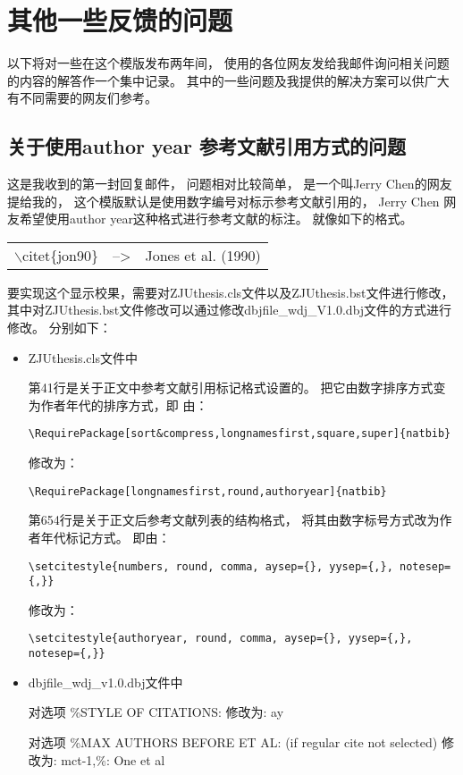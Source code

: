 \chapter{其他一些反馈的问题}

以下将对一些在这个模版发布两年间，
使用的各位网友发给我邮件询问相关问题的内容的解答作一个集中记录。
其中的一些问题及我提供的解决方案可以供广大有不同需要的网友们参考。

\section{关于使用author year 参考文献引用方式的问题}

这是我收到的第一封回复邮件，
问题相对比较简单，
是一个叫Jerry Chen的网友提给我的，
这个模版默认是使用数字编号对标示参考文献引用的，
Jerry Chen 网友希望使用author year这种格式进行参考文献的标注。
就像如下的格式。

\begin{center}
\begin{tabular}{p{3cm}cp{5cm}}
$\backslash$citet\{jon90\} & --> & Jones et al. (1990) \\
\end{tabular}
\end{center}

要实现这个显示校果，需要对ZJUthesis.cls文件以及ZJUthesis.bst文件进行修改，
其中对ZJUthesis.bst文件修改可以通过修改dbjfile\_wdj\_V1.0.dbj文件的方式进行修改。
分别如下：

\begin{itemize}
\item{ZJUthesis.cls文件中}

第41行是关于正文中参考文献引用标记格式设置的。
把它由数字排序方式变为作者年代的排序方式，即
由：

{
\verb+\RequirePackage[sort&compress,longnamesfirst,square,super]{natbib}+
}

修改为：

{
\verb+\RequirePackage[longnamesfirst,round,authoryear]{natbib}+
}

第654行是关于正文后参考文献列表的结构格式，
将其由数字标号方式改为作者年代标记方式。
即由：

{
\verb+\setcitestyle{numbers, round, comma, aysep={}, yysep={,}, notesep={,}}+
}

修改为：

{
\verb+\setcitestyle{authoryear, round, comma, aysep={}, yysep={,}, notesep={,}}+
}

\item{dbjfile\_wdj\_v1.0.dbj文件中}

对选项
\%STYLE OF CITATIONS: 
修改为:  ay

对选项
\%MAX AUTHORS BEFORE ET AL: (if regular cite not selected)
修改为:  mct-1,\%: One et al

\end{itemize}

